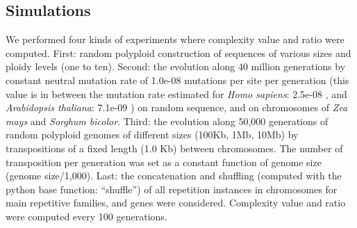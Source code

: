 \subsection{Simulations}

We performed four kinds of experiments where complexity value and ratio were computed. First: random polyploid construction of sequences of various sizes and ploidy levels (one to ten). Second: the evolution along 40 million generations by constant neutral mutation rate of 1.0e-08 mutations per site per generation (this value is in between the mutation rate estimated for {\it Homo sapiens}: 2.5e-08 \cite{Nachman2000} , and \textit{Arabidopsis thaliana}: 7.1e-09 \cite{Ossowski2010}) on random sequence, and on chromosomes of \textit{Zea mays} and \textit{Sorghum bicolor}. Third: the evolution along 50,000 generations of random polyploid genomes of different sizes (100Kb, 1Mb, 10Mb) by transpositions of a fixed length (1.0 Kb) between chromosomes. The number of transposition per generation was set as a constant function of genome size (genome size/1,000). Last: the concatenation and shuffling (computed with the python base function: ``shuffle'') of all repetition instances in chromosomes for main repetitive families, and genes were considered. Complexity value and ratio were computed every 100 generations. 



